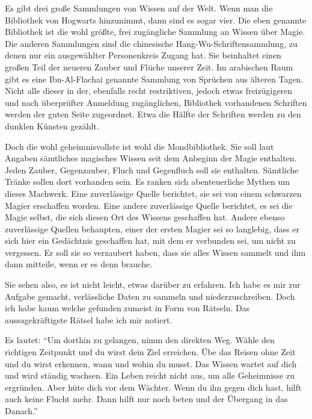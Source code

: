 \begin{buch}
Es gibt drei große Sammlungen von Wissen auf der Welt. Wenn man die Bibliothek von Hogwarts hinzunimmt, dann sind es sogar vier. Die eben genannte Bibliothek ist die wohl größte, frei zugängliche Sammlung an Wissen über Magie. Die anderen Sammlungen sind die chinesische Hang-Wu-Schriftensammlung, zu denen nur ein ausgewählter Personenkreis Zugang hat. Sie beinhaltet einen großen Teil der neueren Zauber und Flüche unserer Zeit. Im arabischen Raum gibt es eine Ibn-Al-Flachai genannte Sammlung von Sprüchen aus älteren Tagen. Nicht alle dieser in der, ebenfalls recht restriktiven, jedoch etwas freizügigeren und nach überprüfter Anmeldung zugänglichen, Bibliothek vorhandenen Schriften werden der guten Seite zugeordnet. Etwa die Hälfte der Schriften werden zu den dunklen Künsten gezählt.

Doch die wohl geheimnisvollste ist wohl die Mondbibliothek. Sie soll laut Angaben sämtliches magisches Wissen seit dem Anbeginn der Magie enthalten. Jeden Zauber, Gegenzauber, Fluch und Gegenfluch soll sie enthalten. Sämtliche Tränke sollen dort vorhanden sein. Es ranken sich abenteuerliche Mythen um dieses Machwerk. Eine zuverlässige Quelle berichtet, sie sei von einem schwarzen Magier erschaffen worden. Eine andere zuverlässige Quelle berichtet, es sei die Magie selbst, die sich diesen Ort des Wissens geschaffen hat. Andere ebenso zuverlässige Quellen behaupten, einer der ersten Magier sei so langlebig, dass er sich hier ein Gedächtnis geschaffen hat, mit dem er verbunden sei, um nicht zu vergessen. Er soll sie so verzaubert haben, dass sie alles Wissen sammelt und ihm dann mitteile, wenn er es denn brauche.

Sie sehen also, es ist nicht leicht, etwas darüber zu erfahren. Ich habe es mir zur Aufgabe gemacht, verlässliche Daten zu sammeln und niederzuschreiben. Doch ich habe kaum welche gefunden \gst zumeist in Form von Rätseln. Das aussagekräftigste Rätsel habe ich mir notiert.

Es lautet: \enquote{Um dorthin zu gelangen, nimm den direkten Weg. Wähle den richtigen Zeitpunkt und du wirst dein Ziel erreichen. Übe das Reisen ohne Zeit und du wirst erkennen, wann und wohin du musst. Das Wissen wartet auf dich und wird ständig wachsen. Ein Leben reicht nicht aus, um alle Geheimnisse zu ergründen. Aber hüte dich vor dem Wächter. Wenn du ihn gegen dich hast, hilft auch keine Flucht mehr. Dann hilft nur noch beten und der Übergang in das Danach.}


\end{buch}
